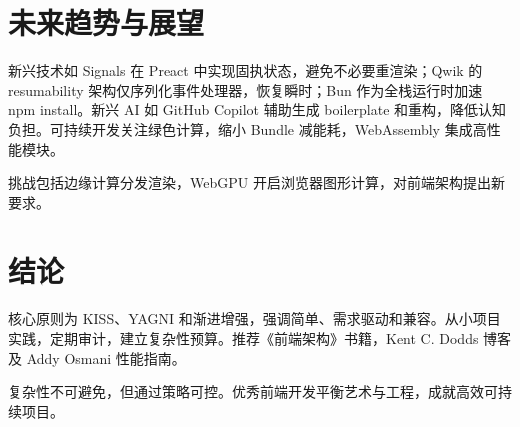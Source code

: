 \chapter{未来趋势与展望}
新兴技术如 Signals 在 Preact 中实现固执状态，避免不必要重渲染；Qwik 的 resumability 架构仅序列化事件处理器，恢复瞬时；Bun 作为全栈运行时加速 npm install。新兴 AI 如 GitHub Copilot 辅助生成 boilerplate 和重构，降低认知负担。可持续开发关注绿色计算，缩小 Bundle 减能耗，WebAssembly 集成高性能模块。\par
挑战包括边缘计算分发渲染，WebGPU 开启浏览器图形计算，对前端架构提出新要求。\par
\chapter{结论}
核心原则为 KISS、YAGNI 和渐进增强，强调简单、需求驱动和兼容。从小项目实践，定期审计，建立复杂性预算。推荐《前端架构》书籍，Kent C. Dodds 博客及 Addy Osmani 性能指南。\par
复杂性不可避免，但通过策略可控。优秀前端开发平衡艺术与工程，成就高效可持续项目。\par
